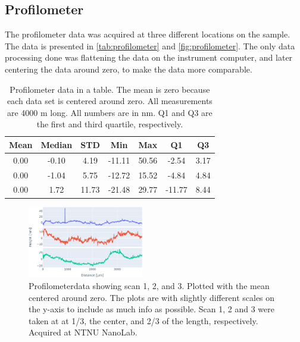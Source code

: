 
\subsection{Profilometer}
\label{results:profilometer}

The profilometer data was acquired at three different locations on the sample.
The data is presented in \autoref{tab:profilometer} and \autoref{fig:profilometer}.
The only data processing done was flattening the data on the instrument computer, and later centering the data around zero, to make the data more comparable.

\begin{table}[ht]
    \centering
    \caption{
        Profilometer data in a table.
        The mean is zero because each data set is centered around zero.
        All measurements are 4000 \textmu m long.
        All numbers are in nm.
        Q1 and Q3 are the first and third quartile, respectively.
    }
    \begin{tabular}{ccccccc}
        Mean & Median & STD   & Min    & Max   & Q1     & Q3   \\
        \hline
        0.00 & -0.10  & 4.19  & -11.11 & 50.56 & -2.54  & 3.17 \\
        0.00 & -1.04  & 5.75  & -12.72 & 15.52 & -4.84  & 4.84 \\
        0.00 & 1.72   & 11.73 & -21.48 & 29.77 & -11.77 & 8.44 \\
    \end{tabular}
    \label{tab:profilometer}
\end{table}



\begin{figure}[ht]
    \centering
    \includegraphics[width=0.45\textwidth]{figures/profilometer_graph.jpg}
    \caption{Profilometerdata showing scan 1, 2, and 3.
        Plotted with the mean centered around zero.
        The plots are with slightly different scales on the y-axis to include as much info as possible.
        Scan 1, 2 and 3 were taken at at 1/3, the center, and 2/3 of the length, respectively.
        Acquired at NTNU NanoLab.
    }
    \label{fig:profilometer}
\end{figure}



